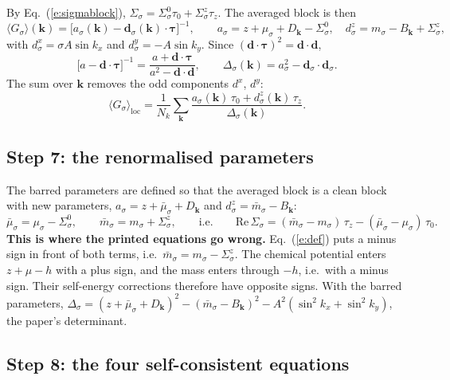 \documentclass[11pt,a4paper]{article}
\begin{document}
By Eq.~(\ref{e:sigmablock}), $\Sigma_\sigma=\Sigma^0_\sigma\tau_0+\Sigma^z_\sigma\tau_z$. The averaged block is then
\begin{equation}
\langle G_\sigma\rangle(\bm k)=\big[a_\sigma(\bm k)-\bm d_\sigma(\bm k)\cdot\bm\tau\big]^{-1},\qquad
a_\sigma=z+\mu_\sigma+D_{\bm k}-\Sigma^0_\sigma,\quad
d^z_\sigma=m_\sigma-B_{\bm k}+\Sigma^z_\sigma,
\end{equation}
with $d^x_\sigma=\sigma A\sin k_x$ and $d^y_\sigma=-A\sin k_y$. Since $(\bm d\cdot\bm\tau)^2=\bm d\cdot\bm d$,
\begin{equation}
\big[a-\bm d\cdot\bm\tau\big]^{-1}=\frac{a+\bm d\cdot\bm\tau}{a^2-\bm d\cdot\bm d},\qquad
\Delta_\sigma(\bm k)=a_\sigma^2-\bm d_\sigma\cdot\bm d_\sigma .
\end{equation}
The sum over $\bm k$ removes the odd components $d^x$, $d^y$:
\begin{equation}
\langle G_\sigma\rangle_{\mathrm{loc}}=\frac1{N_k}\sum_{\bm k}\frac{a_\sigma(\bm k)\,\tau_0+d^z_\sigma(\bm k)\,\tau_z}{\Delta_\sigma(\bm k)} .
\label{e:gloc}
\end{equation}

\subsection{Step 7: the renormalised parameters}\label{st:identify}

The barred parameters are defined so that the averaged block is a clean block with new
parameters, $a_\sigma=z+\bar\mu_\sigma+D_{\bm k}$ and $d^z_\sigma=\bar m_\sigma-B_{\bm k}$:
\begin{equation}
\bar\mu_\sigma=\mu_\sigma-\Sigma^0_\sigma,\qquad \bar m_\sigma=m_\sigma+\Sigma^z_\sigma,
\qquad\text{i.e.}\qquad
\mathrm{Re}\,\Sigma_\sigma=(\bar m_\sigma-m_\sigma)\,\tau_z-(\bar\mu_\sigma-\mu_\sigma)\,\tau_0 .
\end{equation}
\textbf{This is where the printed equations go wrong.} Eq.~(\ref{e:def}) puts a minus sign in
front of both terms, i.e.\ $\bar m_\sigma=m_\sigma-\Sigma^z_\sigma$. The chemical potential enters
$z+\mu-h$ with a plus sign, and the mass enters through $-h$, i.e.\ with a minus sign. Their
self-energy corrections therefore have opposite signs. With the barred parameters,
$\Delta_\sigma=(z+\bar\mu_\sigma+D_{\bm k})^2-(\bar m_\sigma-B_{\bm k})^2-A^2(\sin^2k_x+\sin^2k_y)$, the
paper's determinant.

\subsection{Step 8: the four self-consistent equations}\label{st:equations}
\end{document}
